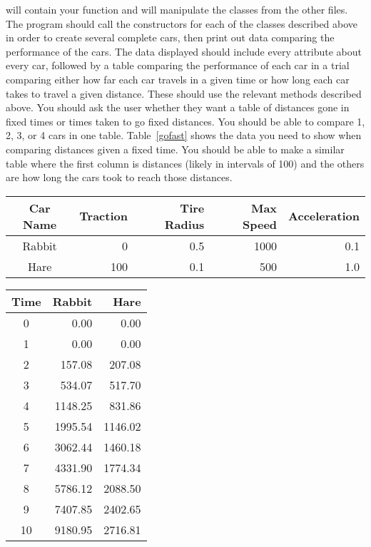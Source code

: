 \documentclass[11pt]{cselabheader}
\begin{document}
\begin{ex}
   will contain your  function and will
  manipulate the classes from the other files. The program should call the
  constructors for each of the classes described above in order to create
  several complete cars, then print out data comparing the performance of the
  cars. The data displayed should include every attribute about every car,
  followed by a table comparing the performance of each car in a trial
  comparing either how far each car travels in a given time or how long each
  car takes to travel a given distance. These should use the relevant methods
  described above. You should ask the user whether they want a table of distances
  gone in fixed times or times taken to go fixed distances. You should be able
  to compare 1, 2, 3, or 4 cars in one table. Table~\ref{gofast} shows the
  data you need to show when comparing distances given a fixed time. You should be
  able to make a similar table where the first column is distances (likely in
  intervals of 100) and the others are how long the cars took to reach those
  distances.
  
  \begin{center}
    \begin{tabular}{crrrr}
    \toprule
    Car Name & Traction & Tire Radius & Max Speed & Acceleration\\
    \midrule
    Rabbit & 0 & 0.5 & 1000 & 0.1\\
    Hare & 100 & 0.1 & 500 & 1.0\\
    \bottomrule
    \end{tabular}
  \end{center}
  
  \begin{center}
    \begin{tabular}{crr}
    \toprule
    Time & Rabbit & Hare\\
    \midrule
    0 & 0.00 & 0.00\\
    1 & 0.00 & 0.00\\
    2 & 157.08 & 207.08\\
    3 & 534.07 & 517.70\\
    4 & 1148.25 & 831.86\\
    5 & 1995.54 & 1146.02\\
    6 & 3062.44 & 1460.18\\
    7 & 4331.90 & 1774.34\\
    8 & 5786.12 & 2088.50\\
    9 & 7407.85 & 2402.65\\
    10 & 9180.95 & 2716.81\\
    \bottomrule
    \end{tabular}
    \label{gofast}
  \end{center}
  

\end{ex}
\end{document}
